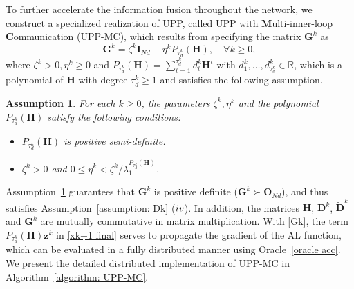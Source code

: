 \documentclass[12pt,draftcls,onecolumn]{IEEEtran}
\newcommand{\bG}{{\mathbf{G}}}
\newcommand{\bH}{{\mathbf{H}}}
\newcommand{\bD}{{\mathbf{D}}}
\newtheorem{assumption}{Assumption}
\begin{document}
To further accelerate the information fusion throughout the network, we construct a specialized realization of UPP, called UPP with \textbf{M}ulti-inner-loop \textbf{C}ommunication (UPP-MC), which results from specifying the matrix $\bG^k$ as 
\begin{equation}
\mathbf{G}^k = \zeta^k \mathbf{I}_{Nd} - \eta^k P_{\tau_d^k}(\mathbf{H}), \quad\forall k\ge0,\label{Gk}
\end{equation}
where $\zeta^k>0,\eta^k\geq 0$ and $P_{\tau_d^k}(\mathbf{H})=\sum_{t=1}^{\tau_d^k}d_t^k\mathbf{H}^t$ with $d_1^k,\dots,d_{\tau_d^k}^k\in\mathbb{R}$, which is a polynomial of $\bH$ with degree $\tau_d^k\geq 1$ and satisfies the following assumption.
\begin{assumption}\label{assumption polynomial}
For each $k\geq 0$, the parameters $\zeta^k,\eta^k$ and the polynomial $P_{\tau_d^k}(\mathbf{H})$ satisfy the following conditions:
\begin{itemize}
    \item[($\romannumeral1$)] $P_{\tau_d^k}(\mathbf{H})$ is positive semi-definite.
    \item[($\romannumeral2$)] $\zeta^k>0$ and $0\leq\eta^k<\zeta^k/\lambda_1^{P_{\tau_d^k}(\mathbf{H})}$.
\end{itemize}
\end{assumption}

Assumption~\ref{assumption polynomial} guarantees that $\mathbf{G}^k$ is positive definite ($\mathbf{G}^k\succ \mathbf{O}_{Nd}$), and thus satisfies Assumption~\ref{assumption: Dk} ($\romannumeral4$). In addition, the matrices $\mathbf{H}$, $\bD^k$, $\tilde{\bD}^k$ and $\bG^k$ are mutually commutative in matrix multiplication. With \eqref{Gk}, the term $P_{\tau_d^k}(\mathbf{H})\mathbf{z}^k$ in \eqref{xk+1 final} serves to propagate the gradient of the AL function, which can be evaluated in a fully distributed manner using Oracle~\ref{oracle acc}. We present the detailed distributed implementation of UPP-MC in Algorithm~\ref{algorithm: UPP-MC}.
\end{document}
